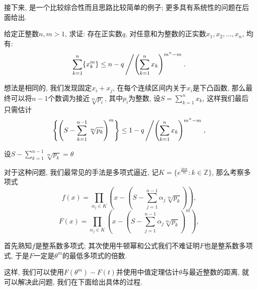 \documentclass[lang=cn,12pt,thmcnt=section]{elegantbook}
\begin{document}
接下来, 是一个比较综合性而且思路比较简单的例子; 更多具有系统性的问题在后面给出.

\begin{example}
给定正整数$n,m>1$, 求证: 存在正实数$q$, 对任意和为整数的正实数$x_1,x_2,\dots{},x_n$, 均有: 
\[
\sum_{k=1}^n \{x_k^m\}\le n-q\left/\left(\sum\limits_{k=1}^n x_k\right)^{m^n-m}\right..
\]
\end{example}

\begin{analysis}
想法是相同的, 我们发现固定$x_i+x_j$, 在每个连续区间内关于$x_i$是下凸函数, 那么最终可以将$n-1$个数调为接近$\sqrt[m]{p_i}$, 其中$p_i$为整数, 设$S=\sum\limits_{k=1}^n x_k$, 这样我们最后只需估计
\[
\left\{\left(S-\sum_{k=1}^{n-1}\sqrt[m]{p_k}\right)^m\right\}\le 1-q\left/\left(\sum\limits_{k=1}^n x_k\right)^{m^n-m}\right.,
\]

设$S-\sum_{k=1}^{n-1}\sqrt[m]{p_k}=\theta$

对于这种问题, 我们最常见的手法是多项式逼近, 记$K=\{e^{\frac{2k \mathrm{i} \pi}{m}}:k\in\mathbb{Z}\}$, 那么考察多项式
\[
f(x)=\prod_{\alpha_{j}\in K}\left(x-\left(S-\sum_{j=1}^{n-1}\alpha_j \sqrt[m]{p_k}\right)\right),
\]
\[
F(x)=\prod_{\alpha_{j}\in K}\left(x-\left(S-\sum_{j=1}^{n-1}\alpha_j \sqrt[m]{p_k}\right)^m\right),
\]

首先熟知$f$是整系数多项式; 其次使用牛顿幂和公式我们不难证明$F$也是整系数多项式, 于是$F$一定是$\theta^m$的最低多项式的倍数.

这样, 我们可以使用$F(\theta^m)-F(t)$并使用中值定理估计$\theta$与最近整数的距离, 就可以解决此问题, 我们在下面给出具体的过程.
\end{analysis}
\end{document}
